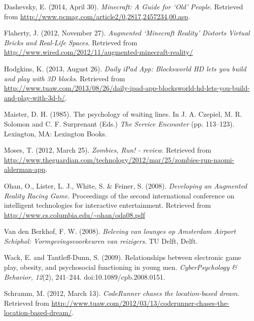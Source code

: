 \documentclass[a4paper,titlepage]{scrartcl}
\begin{document}
\begin{thebibliography}{1}

 Dashevsky, E. (2014, April 30). \textit{Minecraft: A Guide for `Old' People}. Retrieved from \url{http://www.pcmag.com/article2/0,2817,2457234,00.asp}.

 Flaherty, J. (2012, November 27). \textit{Augmented `Minecraft Reality' Distorts Virtual Bricks and Real-Life Spaces}. Retrieved from \url{http://www.wired.com/2012/11/augmented-minecraft-reality/}

 Hodgkins, K. (2013, August 26). \textit{Daily iPad App: Blocksworld HD lets you build and play with 3D blocks}. Retrieved from \url{http://www.tuaw.com/2013/08/26/daily-ipad-app-blocksworld-hd-lets-you-build-and-play-with-3d-b/}.

 Maister, D. H. (1985). The psychology of waiting lines. In J. A. Czepiel, M. R. Solomon and C. F. Surprenant (Eds.) \textit{The Service Encounter} (pp. 113--123). Lexington, MA: Lexington Books.

 Moses, T. (2012, March 25). \textit{Zombies, Run! - review}. Retrieved from \url{http://www.theguardian.com/technology/2012/mar/25/zombies-run-naomi-alderman-app}.

 Ohan, O., Lister, L. J., White, S. \& Feiner, S. (2008). \textit{Developing an Augmented Reality Racing Game.} Proceedings of the second international conference on intelligent technologies for interactive entertainment. Retrieved from \url{http://www.cs.columbia.edu/~ohan/oda08.pdf}

 Van den Berkhof, F. W. (2008). \textit{Beleving van lounges op Amsterdam Airport Schiphol: Vormgevingsvoorkeuren van reizigers}. TU Delft, Delft.


 Wack, E. and Tantleff-Dunn, S. (2009). Relationships between electronic game play, obesity, and psychosocial functioning in young men. \textit{CyberPsychology \& Behavior, 12}(2), 241--244. doi:10.1089/cpb.2008.0151.




 Schramm, M. (2012, March 13). \textit{CodeRunner chases the location-based dream}. Retrieved from \url{http://www.tuaw.com/2012/03/13/coderunner-chases-the-location-based-dream/}.


\end{thebibliography}
\end{document}
